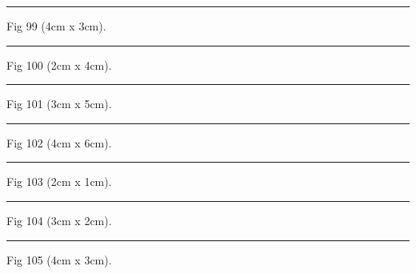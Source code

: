 \documentclass[a4paper,11pt]{article}
\begin{document}
\begin{swarmwrap}%
  \begin{minipage}[t]{4cm}
    \centering
    \rule{\linewidth}{3cm}
    {\footnotesize Fig 99 (4cm x 3cm).}
  \end{minipage}%
\end{swarmwrap}%
\swarmwrapnext
\lipsum[99]%

\begin{swarmwrap}%
  \begin{minipage}[t]{2cm}
    \centering
    \rule{\linewidth}{4cm}
    {\footnotesize Fig 100 (2cm x 4cm).}
  \end{minipage}%
\end{swarmwrap}%
\swarmwrapnext
\lipsum[100]%

\begin{swarmwrap}%
  \begin{minipage}[t]{3cm}
    \centering
    \rule{\linewidth}{5cm}
    {\footnotesize Fig 101 (3cm x 5cm).}
  \end{minipage}%
\end{swarmwrap}%
\swarmwrapnext
\lipsum[101]%

\begin{swarmwrap}%
  \begin{minipage}[t]{4cm}
    \centering
    \rule{\linewidth}{6cm}
    {\footnotesize Fig 102 (4cm x 6cm).}
  \end{minipage}%
\end{swarmwrap}%
\swarmwrapnext
\lipsum[102]%

\begin{swarmwrap}%
  \begin{minipage}[t]{2cm}
    \centering
    \rule{\linewidth}{1cm}
    {\footnotesize Fig 103 (2cm x 1cm).}
  \end{minipage}%
\end{swarmwrap}%
\swarmwrapnext
\lipsum[103]%

\begin{swarmwrap}%
  \begin{minipage}[t]{3cm}
    \centering
    \rule{\linewidth}{2cm}
    {\footnotesize Fig 104 (3cm x 2cm).}
  \end{minipage}%
\end{swarmwrap}%
\swarmwrapnext
\lipsum[104]%

\begin{swarmwrap}%
  \begin{minipage}[t]{4cm}
    \centering
    \rule{\linewidth}{3cm}
    {\footnotesize Fig 105 (4cm x 3cm).}
  \end{minipage}%
\end{swarmwrap}%
\swarmwrapnext
\lipsum[105]%
\end{document}
